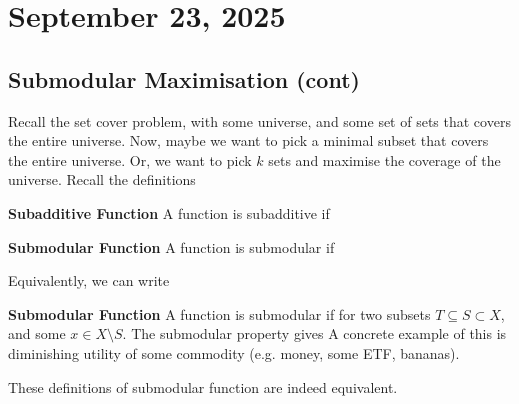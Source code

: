 \section{September 23, 2025}

\subsection{Submodular Maximisation (cont)}
Recall the set cover problem, with some universe, and some set of sets that covers the entire universe. Now, maybe we want to pick a minimal subset that covers the entire universe. Or, we want to pick $k$ sets and maximise the coverage of the universe. Recall the definitions

\begin{definition}
    \textbf{Subadditive Function}
    A function
    is subadditive if
\end{definition}

\begin{definition}
    \textbf{Submodular Function}
    A function
    is submodular if
\end{definition}

Equivalently, we can write
\begin{definition}
    \textbf{Submodular Function}
    A function
    is submodular if for two subsets $T \subseteq S \subset X$, and some $x \in X \setminus S$. The submodular property gives
    A concrete example of this is diminishing utility of some commodity (e.g. money, some ETF, bananas).
\end{definition}

\begin{proposition}
    These definitions of submodular function are indeed equivalent.
\end{proposition}

